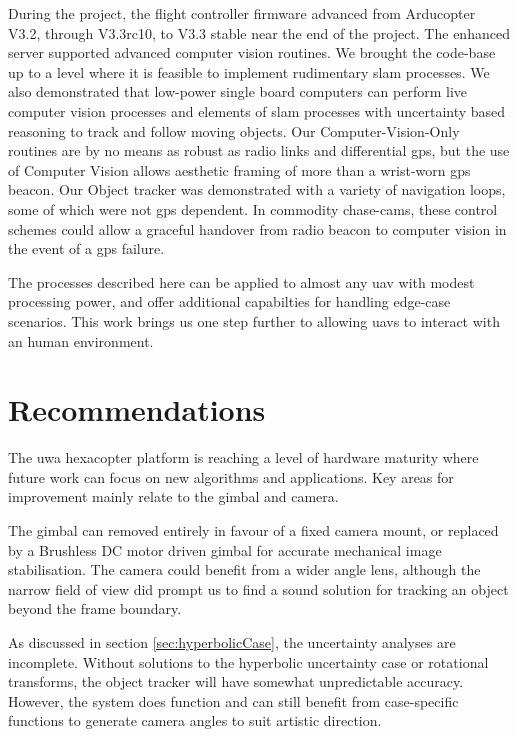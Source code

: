 \documentclass[a4paper, 11pt, titlepage]{article}
\begin{document}
During the project, the flight controller firmware advanced from Arducopter V3.2, through V3.3rc10, to V3.3 stable near the end of the project.
The enhanced server supported advanced computer vision routines.
We brought the code-base up to a level where it is feasible to implement rudimentary \gls{slam} processes. We also demonstrated that low-power single board computers can perform live computer vision processes and elements of \gls{slam} processes with uncertainty based reasoning to track and follow moving objects. Our Computer-Vision-Only routines are by no means as robust as radio links and differential \gls{gps}, but the use of Computer Vision allows aesthetic framing of more than a wrist-worn \gls{gps} beacon. Our Object tracker was demonstrated with a variety of navigation loops, some of which were not \gls{gps} dependent. In commodity chase-cams, these control schemes could allow a graceful handover from radio beacon to computer vision in the event of a \gls{gps} failure.

The processes described here can be applied to almost any \gls{uav} with modest processing power, and offer additional capabilties for handling edge-case scenarios.
This work brings us one step further to allowing \glspl{uav} to interact with an human environment.



\section{Recommendations}

  The \gls{uwa} hexacopter platform is reaching a level of hardware maturity where future work can focus on new algorithms and applications.  Key areas for improvement mainly relate to the gimbal and camera.

  The gimbal can removed entirely in favour of a fixed camera mount, or replaced by a Brushless DC motor driven gimbal for accurate mechanical image stabilisation.  The camera could benefit from a wider angle lens, although the narrow field of view did prompt us to find a sound solution for tracking an object beyond the frame boundary.

  As discussed in section \ref{sec:hyperbolicCase}, the uncertainty analyses are incomplete.
  Without solutions to the hyperbolic uncertainty case or rotational transforms, the object tracker will have somewhat unpredictable accuracy.  However, the system does function and can still benefit from case-specific functions to generate camera angles to suit artistic direction.
\end{document}
